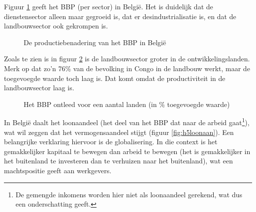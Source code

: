 Figuur \ref{fig:h5bbpbel} geeft het BBP (per sector) in Belgi\"e. Het is duidelijk dat de dienstensector alleen maar gegroeid is, dat er desindustrialisatie is, en dat de landbouwsector ook gekrompen is.

\begin{figure}[H]
\small\centering\captionsetup{justification=centering,margin=2cm}
\caption{De productiebenadering van het BBP in Belgi\"e}
\label{fig:h5bbpbel}
\end{figure}

Zoals te zien is in figuur \ref{fig:h5bbpwereld} is de landbouwsector groter in de ontwikkelingslanden. Merk op dat zo'n 76\% van de bevolking in Congo in de landbouw werkt, maar de toegevoegde waarde toch laag is. Dat komt omdat de productiviteit in de landbouwsector laag is.

\begin{figure}[H]
\centering
{}
\caption{Het BBP ontleed voor een aantal landen (in \% toegevoegde waarde)}
\label{fig:h5bbpwereld}
\end{figure}

In Belgi\"e daalt het loonaandeel (het deel van het BBP dat naar de arbeid gaat\footnote{De gemengde inkomens worden hier niet als loonaandeel gerekend, wat dus een onderschatting geeft.}), wat wil zeggen dat het vermogensaandeel stijgt (figuur \ref{fig:h5loonaan}). Een belangrijke verklaring hiervoor is de globalisering. In die context is het gemakkelijker kapitaal te bewegen dan arbeid te bewegen (het is gemakkelijker in het buitenland te investeren dan te verhuizen naar het buitenland), wat een machtspositie geeft aan werkgevers.

